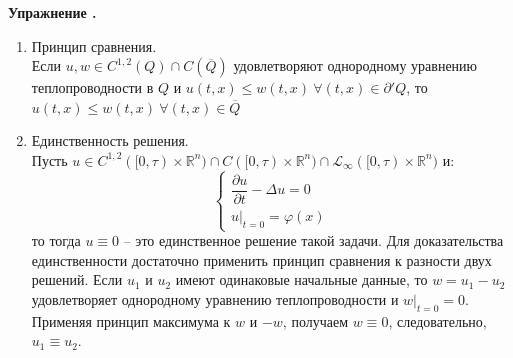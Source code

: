\documentclass[11pt,a4paper]{report}
\numberwithin{equation}{section}
\numberwithin{figure}{chapter}
\numberwithin{table}{chapter}
\newif\ifinmathphysstatement
\newenvironment{myexe}[1][]{%
    \refstepcounter{exectr}%
    \inmathphysstatementtrue
    \begin{tcolorbox}[mathphysblock,colframe=exercisecolor,colback=exercisecolor!3,#1]
    \textbf{\color{exercisecolor}Упражнение \theexectr.}\par\smallskip
}{%
    \end{tcolorbox}
    \inmathphysstatementfalse
}
\newcommand{\R}{\mathbb{R}}
\renewcommand{\L}{\mathcal{L}}
\newcommand{\p}{\partial}
\newcommand{\skobka}[1]{\left( #1 \right)}
\renewcommand{\phi}{\varphi}
\begin{document}
\begin{myexe}
\begin{enumerate}
Для этого упражнения приведём несколько указаний:\\
Введём обозначения $M = \underset{\overline{Q}}{\operatorname{max}}\,u$ и $M_1 = \underset{{\p' Q}}{\operatorname{max}}\,u < M$ и  тогда рассмотрим функцию:
\[
v(t,x) = u(t,x) + \dfrac{1}{2(\operatorname{diam}(\Omega))^2}\skobka{M-M_1}|x-x_0|^2,
\]где $\max\limits_{\overline{Q}}u(t,x) = u(t_0,x_0);\,(t_0,x_0)\not\in\p'Q$
Достаточно проверить два утверждения:
\vspace{0.5cm}
\begin{itemize}
    \item $\dfrac{\p v}{\p t} - \Delta v < 0 \ \forall(t,x)$
    \item $\max v(t,x)$ достигается в $\overline{Q}\setminus\p'Q$
    \end{itemize}
        \item Принцип сравнения.\\
        Если $u,w\in C^{1,2}(Q)\cap C(\overline{Q})$ удовлетворяют однородному уравнению теплопроводности в $Q$ и $u(t,x)\leq w(t,x) \ \forall(t,x)\in\p'Q$, то $u(t,x)\leq w(t,x) \ \forall(t,x)\in\overline{Q}$
        \item Единственность решения.\\
        Пусть $u\in C^{1,2}([0,\tau)\times\R^n) \cap C([0,\tau)\times\R^n) \cap \L_{\infty}([0,\tau)\times\R^n)$ и:
        \[\begin{cases}
        \dfrac{\p u}{\p t} - \Delta u = 0\\
        u\Big|_{t=0} = \phi(x)
    \end{cases}  \] то тогда $u\equiv0$ -- это единственное решение такой задачи.
    Для доказательства единственности достаточно применить принцип сравнения к разности двух решений. Если $u_1$ и $u_2$ имеют одинаковые начальные данные, то $w=u_1-u_2$ удовлетворяет однородному уравнению теплопроводности и $w|_{t=0}=0$. Применяя принцип максимума к $w$ и $-w$, получаем $w\equiv0$, следовательно, $u_1\equiv u_2$.
    \end{enumerate}
\end{myexe}
\end{document}
